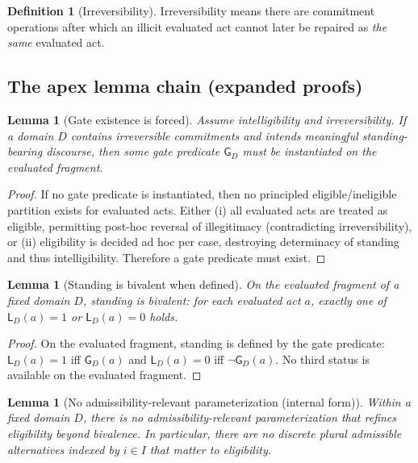 \documentclass[11pt]{article}
\newtheorem{lemma}[theorem]{Lemma}
\theoremstyle{definition}
\newtheorem{definition}[theorem]{Definition}
\newcommand{\Gate}{\mathsf{G}}
\newcommand{\Stand}{\mathsf{L}}
\begin{document}
\begin{definition}[Irreversibility]
Irreversibility means there are commitment operations after which an illicit evaluated act cannot later be repaired as \emph{the same} evaluated act.
\end{definition}

\subsection{The apex lemma chain (expanded proofs)}

\begin{lemma}[Gate existence is forced]
\label{lem:gate-existence}
Assume intelligibility and irreversibility.
If a domain $D$ contains irreversible commitments and intends meaningful standing-bearing discourse, then some gate predicate $\Gate_D$ must be instantiated on the evaluated fragment.
\end{lemma}

\begin{proof}
If no gate predicate is instantiated, then no principled eligible/ineligible partition exists for evaluated acts.
Either (i) all evaluated acts are treated as eligible, permitting post-hoc reversal of illegitimacy (contradicting irreversibility), or
(ii) eligibility is decided ad hoc per case, destroying determinacy of standing and thus intelligibility.
Therefore a gate predicate must exist.
\end{proof}

\begin{lemma}[Standing is bivalent when defined]
\label{lem:bivalent-standing}
On the evaluated fragment of a fixed domain $D$, standing is bivalent: for each evaluated act $a$, exactly one of $\Stand_D(a)=1$ or $\Stand_D(a)=0$ holds.
\end{lemma}

\begin{proof}
On the evaluated fragment, standing is defined by the gate predicate: $\Stand_D(a)=1$ iff $\Gate_D(a)$ and $\Stand_D(a)=0$ iff $\neg \Gate_D(a)$.
No third status is available on the evaluated fragment.
\end{proof}

\begin{lemma}[No admissibility-relevant parameterization (internal form)]
\label{lem:no-parameterization}
Within a fixed domain $D$, there is no admissibility-relevant parameterization that refines eligibility beyond bivalence.
In particular, there are no discrete plural admissible alternatives indexed by $i\in I$ that matter to eligibility.
\end{lemma}
\end{document}

